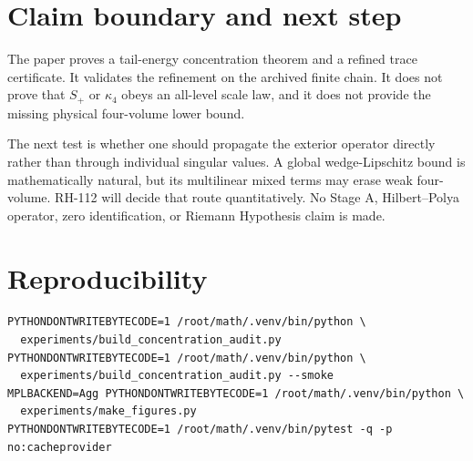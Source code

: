 \documentclass[11pt]{article}
\begin{document}
\section{Claim boundary and next step}
The paper proves a tail-energy concentration theorem and a refined trace
certificate.  It validates the refinement on the archived finite chain.  It
does not prove that $S_+$ or $\kappa_4$ obeys an all-level scale law, and it
does not provide the missing physical four-volume lower bound.

The next test is whether one should propagate the exterior operator directly
rather than through individual singular values.  A global wedge-Lipschitz
bound is mathematically natural, but its multilinear mixed terms may erase
weak four-volume.  RH-112 will decide that route quantitatively.  No Stage A,
Hilbert--Polya operator, zero identification, or Riemann Hypothesis claim is
made.

\section{Reproducibility}
\begin{verbatim}
PYTHONDONTWRITEBYTECODE=1 /root/math/.venv/bin/python \
  experiments/build_concentration_audit.py
PYTHONDONTWRITEBYTECODE=1 /root/math/.venv/bin/python \
  experiments/build_concentration_audit.py --smoke
MPLBACKEND=Agg PYTHONDONTWRITEBYTECODE=1 /root/math/.venv/bin/python \
  experiments/make_figures.py
PYTHONDONTWRITEBYTECODE=1 /root/math/.venv/bin/pytest -q -p no:cacheprovider
\end{verbatim}

\end{document}
